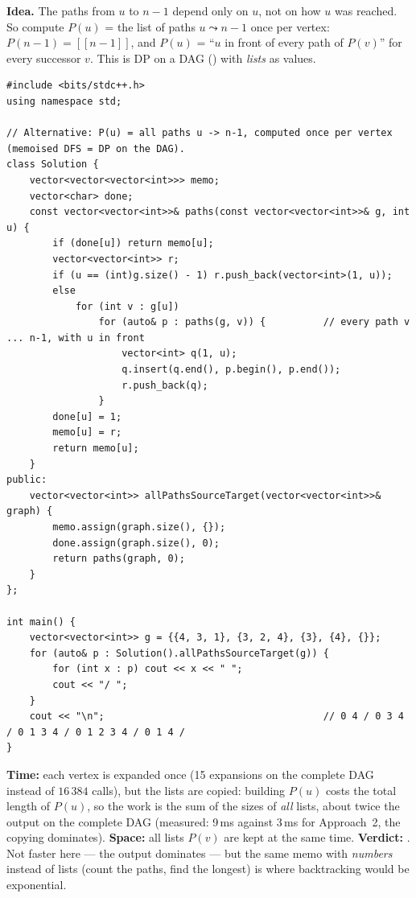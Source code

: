 \begin{alternativebox}
\textbf{Idea.} The paths from $u$ to $n-1$ depend only on $u$, not on how $u$ was reached. So compute $P(u)$ = the list of paths $u \leadsto n-1$ once per vertex: $P(n-1) = [[n-1]]$, and $P(u)$ = ``$u$ in front of every path of $P(v)$'' for every successor $v$. This is DP on a DAG () with \emph{lists} as values.

\begin{lstlisting}[style=cpp]
#include <bits/stdc++.h>
using namespace std;

// Alternative: P(u) = all paths u -> n-1, computed once per vertex (memoised DFS = DP on the DAG).
class Solution {
    vector<vector<vector<int>>> memo;
    vector<char> done;
    const vector<vector<int>>& paths(const vector<vector<int>>& g, int u) {
        if (done[u]) return memo[u];
        vector<vector<int>> r;
        if (u == (int)g.size() - 1) r.push_back(vector<int>(1, u));
        else
            for (int v : g[u])
                for (auto& p : paths(g, v)) {          // every path v ... n-1, with u in front
                    vector<int> q(1, u);
                    q.insert(q.end(), p.begin(), p.end());
                    r.push_back(q);
                }
        done[u] = 1;
        memo[u] = r;
        return memo[u];
    }
public:
    vector<vector<int>> allPathsSourceTarget(vector<vector<int>>& graph) {
        memo.assign(graph.size(), {});
        done.assign(graph.size(), 0);
        return paths(graph, 0);
    }
};

int main() {
    vector<vector<int>> g = {{4, 3, 1}, {3, 2, 4}, {3}, {4}, {}};
    for (auto& p : Solution().allPathsSourceTarget(g)) {
        for (int x : p) cout << x << " ";
        cout << "/ ";
    }
    cout << "\n";                                      // 0 4 / 0 3 4 / 0 1 3 4 / 0 1 2 3 4 / 0 1 4 /
}
\end{lstlisting}

\begin{complexitybox}
\textbf{Time:} each vertex is expanded once (15 expansions on the complete DAG instead of $16\,384$ calls), but the lists are copied: building $P(u)$ costs the total length of $P(u)$, so the work is the sum of the sizes of \emph{all} lists, about twice the output on the complete DAG (measured: 9\,ms against 3\,ms for Approach~2, the copying dominates). \textbf{Space:} all lists $P(v)$ are kept at the same time. \textbf{Verdict:} \ac{}. Not faster here --- the output dominates --- but the same memo with \emph{numbers} instead of lists (count the paths, find the longest) is \VE{} where backtracking would be exponential.
\end{complexitybox}
\end{alternativebox}

